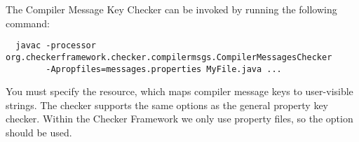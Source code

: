 The Compiler Message Key Checker can be invoked by running the following
command:

\begin{Verbatim}
  javac -processor org.checkerframework.checker.compilermsgs.CompilerMessagesChecker
        -Apropfiles=messages.properties MyFile.java ...
\end{Verbatim}

You must specify the resource, which maps compiler message keys to user-visible
strings.  The checker supports the same options as the general property key checker.
Within the Checker Framework we only use property files,
so the  option should be used.

